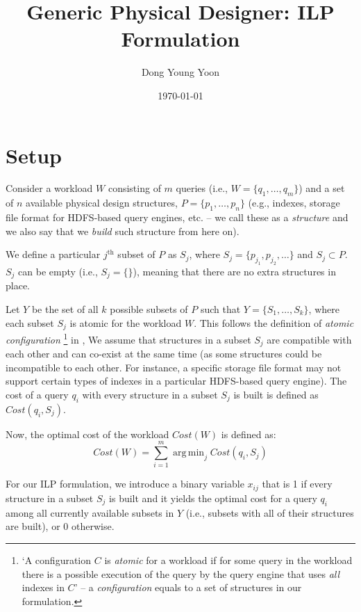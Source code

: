 \documentclass[10pt]{article}
\title{Generic Physical Designer: ILP Formulation}
\author{Dong Young Yoon}
\date{\today}
\DeclareMathOperator*{\argmin}{arg\,min}
\begin{document}
\maketitle

\section{Setup}
Consider a workload $W$ consisting of $m$ queries (i.e., $W = \{q_1, \dots, q_m\}$) and a set of $n$
available physical design structures, $P = \{p_1, \dots, p_n\}$
(e.g., indexes, storage file format for HDFS-based query engines, etc. --
we call these as a \textit{structure} and we also say that we \textit{build} such structure
from here on).

We define a particular $j^\text{th}$ subset of $P$ as $S_j$, where $S_j = \{p_{j_1}, p_{j_2}, \dots\}$
and $S_j \subset P$.
$S_j$ can be empty (i.e., $S_j = \{\}$),
meaning that there are no extra structures in place.

Let $Y$ be the set of all $k$ possible subsets of $P$ such that $Y = \{S_1, \dots, S_k\}$,
where each subset $S_j$ is atomic for the workload $W$.
This follows the definition of \textit{atomic configuration}
\footnote{
`A configuration $C$ is \textit{atomic} for a workload if for some query in the workload
there is a possible execution of the query by the query engine that uses \textit{all} indexes in
$C$' -- a \textit{configuration} equals to a set of structures in our formulation.
}
in \cite{chaudhuri1997efficient},
We assume that structures in a subset $S_j$ are compatible with each other
and can co-exist at the same time
(as some structures could be incompatible to each other.
For instance, a specific storage file format may not support certain types of indexes in a
particular HDFS-based query engine).
The cost of a query $q_i$ with every structure in a subset $S_j$ is built
is defined as $Cost(q_i, S_j)$.

Now, the optimal cost of the workload $Cost(W)$ is defined as:
\begin{equation}
  Cost(W) = \sum_{i=1}^{m} \argmin_{j} Cost(q_i, S_j)
  \label{eq:cost}
\end{equation}

For our ILP formulation, we introduce a binary variable $x_{ij}$
that is 1 if every structure in a subset $S_j$ is built and it yields the optimal cost for
a query $q_i$ among all currently available subsets in $Y$
(i.e., subsets with all of their structures are built), or 0 otherwise.
\end{document}
